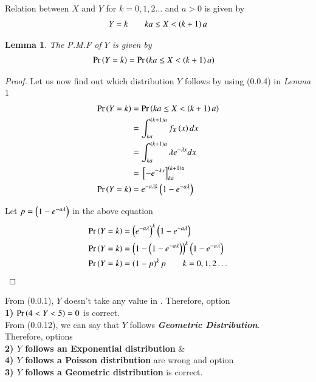 \documentclass[journal,12pt,twocolumn]{IEEEtran}
\begin{document}
Relation between $X$ and $Y$ for $k=0,1,2\ldots$ and $a>0$ is given by
\begin{align}
    Y=k \qquad ka\leq X < \left(k+1\right)a
\end{align}

\newtheorem{lemma}{Lemma}

\begin{lemma}
    The P.M.F of $Y$ is given by
    \begin{align}
        \Pr\left(Y=k\right) &= \Pr\left(ka\leq X < \left(k+1\right)a\right)
    \end{align}
\end{lemma}

\begin{proof}
    Let us now find out which distribution $Y$ follows by using (0.0.4) in \textit{Lemma} 1
    \begin{align}
        \Pr\left(Y=k\right) &= \Pr\left(ka\leq X < \left(k+1\right)a\right)\\
        &= \int_{ka}^{\left(k+1\right)a}f_X\left(x\right)dx\\
        &= \int_{ka}^{\left(k+1\right)a}\lambda e^{-\lambda x}dx\\
        &= {}\left[-e^{-\lambda x}\right]_{ka}^{\left(k+1\right)a}\\
        \Pr\left(Y=k\right) &= e^{-a\lambda k}\left(1 - e^{-a\lambda}\right)
    \end{align}
    
    Let $p=\left(1-e^{-a\lambda}\right)$ in the above equation
    \begin{align}
        \Pr\left(Y=k\right) &= \left(e^{-a\lambda}\right)^k\left(1-e^{-a\lambda}\right)\\
        \Pr\left(Y=k\right) &= \left(1-\left(1-e^{-a\lambda}\right)\right)^k\left(1-e^{-a\lambda}\right)\\
        \Pr\left(Y=k\right) &= \left(1-p\right)^kp \qquad k=0,1,2\ldots
    \end{align}
\end{proof}

From (0.0.1), $Y$ doesn't take any value in .
Therefore, option \\ \textbf{1)} $\Pr\left(4<Y<5\right)=0$ is correct.\\

From (0.0.12), we can say that $Y$ follows \textit{\textbf{Geometric Distribution}}.\\
Therefore, options\\ \textbf{2) $Y$ follows an Exponential distribution} \& \\ \textbf{4) $Y$ follows a Poisson distribution} are wrong and option \\ \textbf{3) $Y$ follows a Geometric distribution} is correct.
\end{document}
